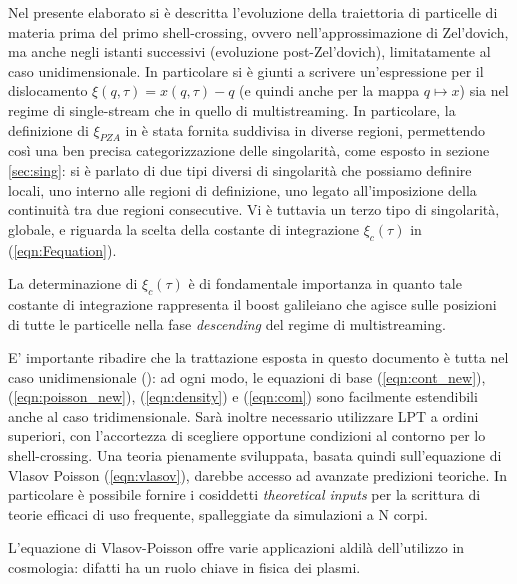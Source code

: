 Nel presente elaborato si è descritta l'evoluzione della traiettoria di 
particelle di materia prima del primo shell-crossing, ovvero nell'approssimazione di
Zel'dovich, ma anche negli istanti successivi (evoluzione post-Zel'dovich), limitatamente al caso unidimensionale. 
In particolare si è giunti a scrivere un'espressione per il dislocamento $\xi(q, \tau) = x(q,\tau)-q$
(e quindi anche per la mappa $q\mapsto x$) sia nel regime di single-stream che in quello di multistreaming.
In particolare, la definizione di $\xi_{PZA}$ in è stata fornita suddivisa in diverse regioni, permettendo così 
una ben precisa categorizzazione delle singolarità, come esposto in sezione \ref{sec:sing}: si è 
parlato di due tipi diversi di singolarità che possiamo definire locali, uno interno alle 
regioni di definizione, uno legato all'imposizione della continuità tra due regioni consecutive.
Vi è tuttavia un terzo tipo di singolarità, globale, e riguarda la scelta della
costante di integrazione $\xi_c(\tau)$ in (\ref{eqn:Fequation}).

\begin{comment}
    qui non ben chiaro cosa si intende per spatial average, e che tipo di singolarità è la terza
\end{comment}

La determinazione di $\xi_c(\tau)$ è di fondamentale importanza in quanto tale costante 
di integrazione rappresenta il boost galileiano che agisce sulle posizioni di tutte le 
particelle nella fase \textit{descending} del regime di multistreaming.

E' importante ribadire che la trattazione esposta in questo documento
è tutta nel caso unidimensionale (\cite{rampf}): ad ogni modo, le equazioni di base (\ref{eqn:cont_new}),
(\ref{eqn:poisson_new}), (\ref{eqn:density}) e (\ref{eqn:com}) sono facilmente estendibili
anche al caso tridimensionale. Sarà inoltre necessario utilizzare LPT a ordini superiori,
con l'accortezza di scegliere opportune condizioni al contorno per lo shell-crossing.
Una teoria pienamente sviluppata, basata quindi sull'equazione di Vlasov Poisson 
(\ref{eqn:vlasov}), darebbe accesso ad avanzate predizioni teoriche. In particolare è possibile
fornire i cosiddetti \textit{theoretical inputs} per la scrittura di teorie efficaci di uso 
frequente, spalleggiate da simulazioni a N corpi.

L'equazione di Vlasov-Poisson offre varie applicazioni aldilà dell'utilizzo in 
cosmologia: difatti ha un ruolo chiave in fisica dei plasmi.